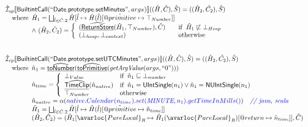 \[\begin{array}{l}
\aI _{cp}\lbr \SF{BuiltintCall}(``\SF{Date.prototype.setMinutes}",args_{})\rbr((\hat{H},\hat{C}), \hat{S})
  = ((\hat{H}_2, \hat{C_2}), \hat{S})\\
\quad\wherec{
  \hat{H}_1 = \bigsqcup_{\hat{l} \in \hat{C}.2} \hat{H}[\hat{l}
    \mapsto \hat{H}(\hat{l})[\avarprop{primitive} \mapsto \top_{Number}]]\\
  \land\ (\hat{H}_2, \hat{C}_2) = 
    \left\{\begin{array}{l@{\quad\quad}l}
      (\ahf{ReturnStore}(\hat{H}_1, \top_{Number}), \hat{C})
      & \ifc{\hat{H}_1 \not\sqsubseteq \bot_{Heap}}\\
      (\bot_{heap}, \bot_{context}) & \owc \\
    \end{array}\right.\\
  }\\
\\\\

\aI _{cp}\lbr \SF{BuiltintCall}(``\SF{Date.prototype.setUTCMinutes}",args_{})\rbr((\hat{H},\hat{C}), \hat{S})
  = ((\hat{H}_2, \hat{C_2}), \hat{S})\\
\quad\wherec{
  \hat{n}_{1} = \ahf{toNumber}(\ahf{toPrimitive}(\hf{getArgValue}(args, ``0")))\\
  \hat{n}_{time} = \left\{\begin{array}{ll}
      \bot_{Value} & \ifc{\hat{n}_{1} \sqsubseteq  \bot_{number}}\\
      \ahf{TimeClip}(\hat{n}_{native})
      & \ifc{\hat{n}_{1} = \SF{UIntSingle}(n_{1}) \lor \hat{n}_{1} = \SF{NUIntSingle}(n_{1}) }\\
      \top_{Number} & \owc
    \end{array}\right.\\
  \hat{n}_{naitve} = \alpha({\inblue native.Calendar(n_{time}).set(\emph{MINUTE}, n_{1}).getTimeInMills()})
    \quad\comment{{\inblue // java, scala}}\\  
  \hat{H}_1 = \bigsqcup_{\hat{l} \in \hat{C}.2} \hat{H}[\hat{l}
    \mapsto \hat{H}(\hat{l})[\avarprop{primitive} \mapsto \hat{n}_{time}]]\\
  (\hat{H}_2, \hat{C}_2) = 
    (\hat{H}_1[\avarloc{PureLocal}_R \mapsto \hat{H}_1(\avarloc{PureLocal}_R)
      [\varprop{return} \mapsto \hat{n}_{time}]], \hat{C})\\
  }\\
\\\\


\end{array}\]
